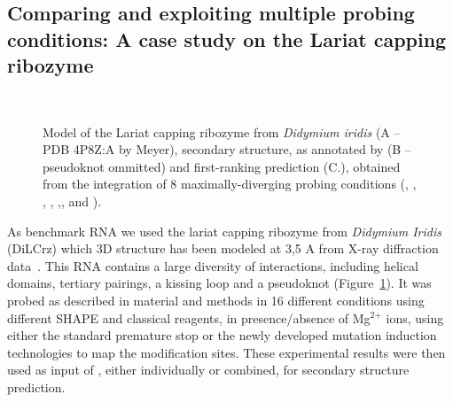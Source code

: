 \documentclass[a4,center,fleqn]{NAR}
\begin{document}


\subsection*{Comparing and exploiting multiple probing conditions: A case study on the Lariat capping ribozyme}


\begin{figure}
	{\\}
	
	\caption{Model of the Lariat capping ribozyme from {\itshape Didymium iridis} (A -- PDB 4P8Z:A by Meyer\etal\cite{Meyer2014}), secondary structure, as annotated by  (B -- pseudoknot ommitted) and \OurTool first-ranking prediction (C.), obtained from the integration of 8 maximally-diverging probing conditions (\NMIAMg, \OneMSevILUThreeMg, \NAIMg, \OneMSevCE, \CMCTMg,\OneMSevILUThree, and \OneMSevMgCE).\label{fig:didy}}
\end{figure}
As benchmark RNA we used the lariat capping ribozyme from \textit{Didymium Iridis} (DiLCrz) which 3D structure has been modeled at 3,5 A from X-ray diffraction data~\cite{Meyer2014}. This RNA contains a large diversity of interactions, including helical domains, tertiary pairings, a kissing loop and a pseudoknot (Figure~\ref{fig:didy}).
It was probed as described in material and methods in 16 different conditions using different SHAPE and classical reagents, in presence/absence of Mg$^\text{2+}$ ions, using either the standard premature stop or the newly developed mutation induction technologies to map the modification sites. These experimental results were then used as input of \OurTool{}, either individually or combined,  for secondary structure prediction. 
\end{document}
